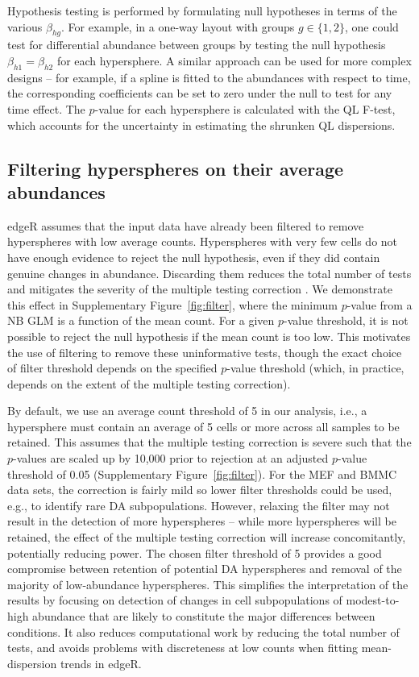\documentclass{article}
\begin{document}
Hypothesis testing is performed by formulating null hypotheses in terms of the various $\beta_{hg}$.
For example, in a one-way layout with groups $g\in\{1,2\}$, one could test for differential abundance between groups by testing the null hypothesis $\beta_{h1}=\beta_{h2}$ for each hypersphere.
A similar approach can be used for more complex designs -- for example, if a spline is fitted to the abundances with respect to time, the corresponding coefficients can be set to zero under the null to test for any time effect.
The $p$-value for each hypersphere is calculated with the QL F-test, which accounts for the uncertainty in estimating the shrunken QL dispersions. 

\subsection{Filtering hyperspheres on their average abundances}
edgeR assumes that the input data have already been filtered to remove hyperspheres with low average counts.
Hyperspheres with very few cells do not have enough evidence to reject the null hypothesis, even if they did contain genuine changes in abundance.
Discarding them reduces the total number of tests and mitigates the severity of the multiple testing correction \cite{bourgon2010independent}.
We demonstrate this effect in Supplementary Figure~\ref{fig:filter}, where the minimum $p$-value from a NB GLM is a function of the mean count.
For a given $p$-value threshold, it is not possible to reject the null hypothesis if the mean count is too low.
This motivates the use of filtering to remove these uninformative tests, though the exact choice of filter threshold depends on the specified $p$-value threshold (which, in practice, depends on the extent of the multiple testing correction).

By default, we use an average count threshold of 5 in our analysis, i.e., a hypersphere must contain an average of 5 cells or more across all samples to be retained.
This assumes that the multiple testing correction is severe such that the $p$-values are scaled up by 10,000 prior to rejection at an adjusted $p$-value threshold of 0.05 (Supplementary Figure~\ref{fig:filter}). 
For the MEF and BMMC data sets, the correction is fairly mild so lower filter thresholds could be used, e.g., to identify rare DA subpopulations.
However, relaxing the filter may not result in the detection of more hyperspheres -- while more hyperspheres will be retained, the effect of the multiple testing correction will increase concomitantly, potentially reducing power.
The chosen filter threshold of 5 provides a good compromise between retention of potential DA hyperspheres and removal of the majority of low-abundance hyperspheres.
This simplifies the interpretation of the results by focusing on detection of changes in cell subpopulations of modest-to-high abundance that are likely to constitute the major differences between conditions.
It also reduces computational work by reducing the total number of tests, and avoids problems with discreteness at low counts when fitting mean-dispersion trends in edgeR.
\end{document}
